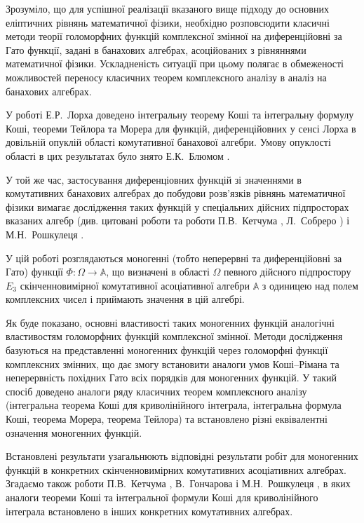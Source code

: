 \documentclass[11pt, reqno]{amsart}
\begin{document}
Зрозуміло, що для успішної реалізації вказаного вище підходу до основних еліптичних рівнянь
математичної фізики, необхідно
розповсюдити класичні методи теорії голоморфних
функцій комплексної змінної %
на диференційовні за Гато функції, задані в банахових алгебрах, асоційованих з рівняннями математичної
фізики.
Ускладненість ситуації при цьому полягає в обмеженості можливостей переносу класичних теорем комплексного
аналізу в аналіз на банахових алгебрах.

У роботі Е.Р.~Лорха \cite{Lorch} доведено інтегральну теорему Коші та інтегральну формулу Коші,
теореми Тейлора та Морера для функцій, диференційовних у сенсі
Лорха в довільній опуклій області комутативної банахової алгебри. Умову опуклості області в цих результатах
було знято Е.К.~Блюмом \cite{Blum}.


У той же час, застосування диференціовних функцій зі значеннями в комутативних банахових алгебрах
до побудови розв'язків рівнянь математичної фізики
вимагає дослідження таких функцій у спеціальних дійсних підпросторах вказаних алгебр (див. цитовані роботи
\cite{Mel'nichenko75,Mel'nichenko03,Mel-Plaksa,Kov-Mel,Mel'nichenko86,Kov-Mel-pr91,Pl-Zb-2013,Pla-Shp-Bull-2012}
та роботи П.В.~Кетчума \cite{Ketchum-28, Ketchum-29}, Л.~Собреро \cite{Sobrero}) і М.Н.~Рошкулеця \cite{Rosculet}.

У цій роботі розглядаються моногенні (тобто неперервні та диференційовні за Гато) функції
$\Phi : \Omega\rightarrow\mathbb{A}$, що визначені в області $\Omega$ певного дійсного підпростору $E_{3}$
скінченновимірної комутативної асоціативної алгебри $\mathbb{A}$ з одиницею над полем комплексних чисел
і приймають значення в цій алгебрі.

Як буде показано, основні властивості таких моногенних функцій
аналогічні властивостям голоморфних функцій комплексної змінної.
Методи дослідження базуються на представленні моногенних функцій через голоморфні функції
комплексних змінних, що дає змогу встановити аналоги умов Коші--Рімана та
неперервність похідних Гато всіх порядків для моногенних функцій.
У такий спосіб доведено аналоги ряду класичних теорем комплексного аналізу
(інтегральна теорема Коші для криволінійного інтеграла, інтегральна формула Коші,
теорема Морера, теорема Тейлора) та
встановлено різні еквівалентні означення моногенних функцій.

Встановлені результати узагальнюють відповідні результати робіт
\cite{Pl-Shp2,Pl-Shp3,Plaksa12,Pl-Shp-Al,Pukh-5} для моногенних функцій в конкретних
скін\-чен\-но\-ви\-мір\-них комутативних асоціативних алгебрах.
Згадаємо також роботи П.В.~Кетчума \cite{Ketchum-28,Ketchum-29},
В.~Гончарова \cite{Goncharow} і М.Н.~Рошкулеця \cite{Rosculet-54,Rosculet-55},
в яких аналоги теореми Коші та інтегральної формули Коші для криволінійного інтеграла
встановлено в інших конкретних комутативних алгебрах.
\end{document}

